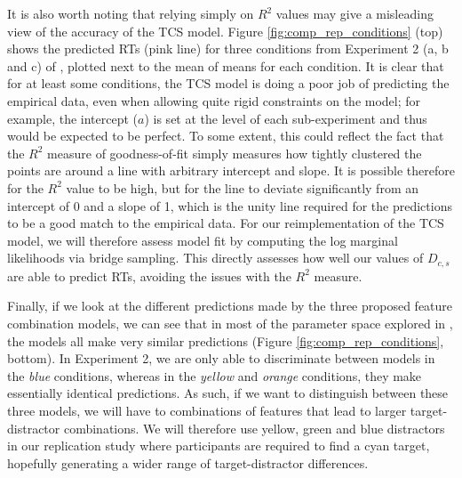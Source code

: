 \documentclass[smallextended, natbib]{svjour3}       %
\begin{document}
It is also worth noting that relying simply on $R^2$ values may give a misleading view of the accuracy of the TCS model. Figure \ref{fig:comp_rep_conditions} (top) shows the predicted RTs (pink line) for three conditions from Experiment 2 (a, b and c) of \citep{buetti2019predicting}, plotted next to the mean of means for each condition. It is clear that for at least some conditions, the TCS model is doing a poor job of predicting the empirical data, even when allowing quite rigid constraints on the model; for example, the intercept ($a$) is set at the level of each sub-experiment and thus would be expected to be perfect. To some extent, this could reflect the fact that the $R^2$ measure of goodness-of-fit simply measures how tightly clustered the points are around a line with arbitrary intercept and slope. It is possible therefore for the $R^2$ value to be high, but for the line to deviate significantly from an intercept of 0 and a slope of 1, which is the unity line required for the predictions to be a good match to the empirical data. For our reimplementation of the TCS model, we will therefore assess model fit by computing the log marginal likelihoods via bridge sampling. This directly assesses how well our values of $D_{c,s}$ are able to predict RTs, avoiding the issues with the $R^2$ measure.

Finally, if we look at the different predictions made by the three proposed feature combination models, we can see that in most of the parameter space explored in \citep{buetti2019predicting}, the models all make very similar predictions (Figure \ref{fig:comp_rep_conditions}, bottom). In Experiment 2, we are only able to discriminate between models in the \textit{blue} conditions, whereas in the \textit{yellow} and \textit{orange} conditions, they make essentially identical predictions. As such, if we want to distinguish between these three models, we will have to combinations of features that lead to larger target-distractor combinations. We will therefore use yellow, green and blue distractors in our replication study where participants are required to find a cyan target, hopefully generating a wider range of target-distractor differences.
\end{document}
